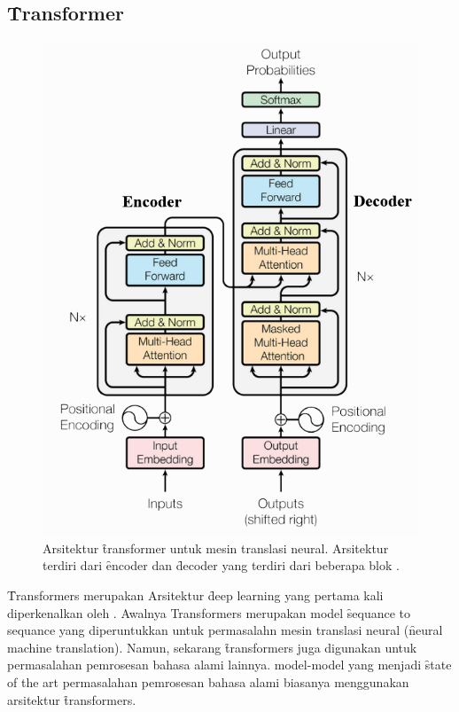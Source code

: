 \chapter{\babTiga}
\label{bab:3}



\noindent{}

\section{\f{Transformer}}

\begin{figure}
	\centering
	\includegraphics[width=0.7\linewidth]{assets/pics/transformers_seq.png}
	\caption{Arsitektur \f{transformer} untuk mesin translasi neural. Arsitektur terdiri dari \f{encoder} dan \f{decoder} yang terdiri dari beberapa blok \citep{transformerori}.}
	\label{fig:transformer}
\end{figure}

\f{Transformers} merupakan Arsitektur \f{deep learning} yang pertama kali diperkenalkan oleh \cite{transformerori}. Awalnya Transformers merupakan model \f{sequance to sequance} yang diperuntukkan untuk permasalahn mesin translasi neural (\f{neural machine translation}). Namun, sekarang \f{transformers} juga digunakan untuk permasalahan pemrosesan bahasa alami lainnya. model-model yang menjadi \f{state of the art} permasalahan pemrosesan bahasa alami biasanya menggunakan arsitektur \f{transformers}.

